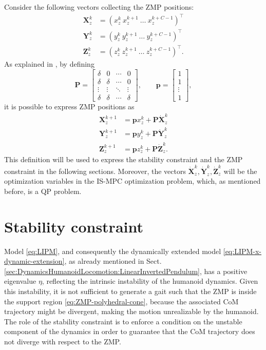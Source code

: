 Consider the following vectors collecting the ZMP positions:
\begin{align}
    \label{eq:ZMP-positions-x-matrix}
    \bm{X}_z^k &= (x_z^k \ x_z^{k+1} \ \dots \ x_z^{k+C-1})^\top \\
    \bm{Y}_z^k &= (y_z^k \ y_z^{k+1} \ \dots \ y_z^{k+C-1})^\top \\
    \bm{Z}_z^k &= (z_z^k \ z_z^{k+1} \ \dots \ z_z^{k+C-1})^\top.
\end{align}
As explained in \cite{Scianca2016ISMPC}, by defining
\begin{equation*}
    \bm{P} =
    \begin{bmatrix}
        \delta & 0 & \cdots & 0 \\
        \delta & \delta & \cdots & 0 \\
        \vdots & \vdots & \ddots & \vdots \\
        \delta & \delta & \cdots & \delta
    \end{bmatrix},
    \qquad
    \bm{p} =
    \begin{bmatrix}
        1 \\ 1 \\ \vdots \\ 1
    \end{bmatrix},
\end{equation*}
it is possible to express ZMP positions as
\begin{align*}
    \bm{X}_z^{k+1} &= \bm{p} x_z^k + \bm{P} \dot{\bm{X}}_z^k \\
    \bm{Y}_z^{k+1} &= \bm{p} y_z^k + \bm{P} \dot{\bm{Y}}_z^k \\
    \bm{Z}_z^{k+1} &= \bm{p} z_z^k + \bm{P} \dot{\bm{Z}}_z^k.
\end{align*}
This definition will be used to express the stability constraint and the
ZMP constraint in the following sections. Moreover, the vectors $\dot{\bm{X}}_z^k,
\dot{\bm{Y}}_z^k, \dot{\bm{Z}}_z^k$ will be the optimization variables in the 
IS-MPC optimization problem, which, as mentioned before, is a QP problem.

\section{Stability constraint}
Model \eqref{eq:LIPM}, and consequently the dynamically extended model
\eqref{eq:LIPM-x-dynamic-extension}, as already mentioned in Sect.
\ref{sec:DynamicsHumanoidLocomotion:LinearInvertedPendulum}, has a positive
eigenvalue $\eta$, reflecting the intrinsic instability of the humanoid dynamics.
Given this instability, it is not sufficient to generate a gait such that
the ZMP is inside the support region \eqref{eq:ZMP-polyhedral-cone},
because the associated CoM trajectory might be divergent,
making the motion unrealizable by the humanoid.
The role of the stability constraint is to enforce a condition on the
unstable component of the dynamics in order to guarantee that the CoM
trajectory does not diverge with respect to the ZMP.

